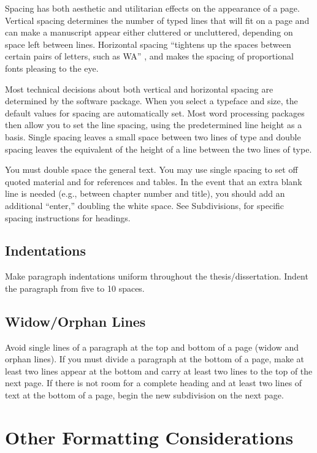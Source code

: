 Spacing has both aesthetic and utilitarian effects on the appearance
of a page. Vertical spacing determines the number of typed lines that
will fit on a page and can make a manuscript appear either cluttered
or uncluttered, depending on space left between lines. Horizontal
spacing ``tightens up the spaces between certain pairs of letters,
such as WA'' \cite[604]{alfieri1988}, and makes the spacing of
proportional fonts pleasing to the eye.

Most technical decisions about both vertical and horizontal spacing
are determined by the software package. When you select a typeface and
size, the default values for spacing are automatically set. Most word
processing packages then allow you to set the line spacing, using the
predetermined line height as a basis. Single spacing leaves a small
space between two lines of type and double spacing leaves the
equivalent of the height of a line between the two lines of type.

You must double space the general text. You may use single spacing to
set off quoted material and for references and tables. In the event
that an extra blank line is needed (e.g., between chapter number and
title), you should add an additional ``enter,'' doubling the white
space. See Subdivisions, for specific spacing instructions for
headings.

\subsection{Indentations}
\label{sec:Indentations}

Make paragraph indentations uniform throughout the
the\-sis/dis\-ser\-ta\-tion. Indent the paragraph from five to 10 spaces.

\subsection{Widow/Orphan Lines}
\label{sec:WidowOrphanLines}

Avoid single lines of a paragraph at the top and bottom of a page
(widow and orphan lines). If you must divide a paragraph at the bottom
of a page, make at least two lines appear at the bottom and carry at
least two lines to the top of the next page. If there is not room for
a complete heading and at least two lines of text at the bottom of a
page, begin the new subdivision on the next page.

\section{Other Formatting Considerations}
\label{sec:OtherFormattingConsiderations}

